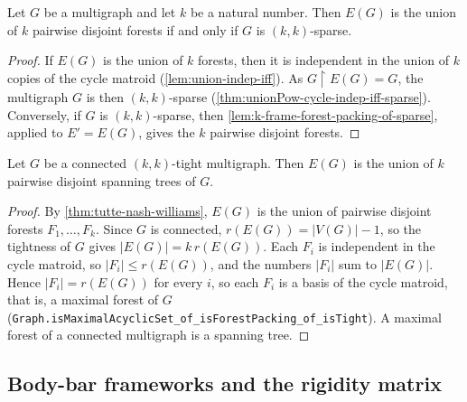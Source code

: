 \begin{theorem}
  \label{thm:tutte-nash-williams}
  \leanok
  Let $G$ be a multigraph and let $k$ be a natural number. Then $E(G)$
  is the union of $k$ pairwise disjoint forests if and only if $G$ is
  $(k, k)$-sparse.
\end{theorem}
\begin{proof}
  \leanok
  If $E(G)$ is the union of $k$ forests, then it is independent in the
  union of $k$ copies of the cycle matroid (\cref{lem:union-indep-iff}).
  As $G \restriction E(G) = G$, the multigraph $G$ is then
  $(k, k)$-sparse (\cref{thm:unionPow-cycle-indep-iff-sparse}).
  Conversely, if $G$ is $(k, k)$-sparse, then
  \cref{lem:k-frame-forest-packing-of-sparse}, applied to $E' = E(G)$,
  gives the $k$ pairwise disjoint forests.
\end{proof}

\begin{corollary}
  \label{cor:k-spanning-trees}
  \leanok
  Let $G$ be a connected $(k, k)$-tight multigraph. Then $E(G)$ is the
  union of $k$ pairwise disjoint spanning trees of $G$.
\end{corollary}
\begin{proof}
  \leanok
  By \cref{thm:tutte-nash-williams}, $E(G)$ is the union of pairwise
  disjoint forests $F_1, \dots, F_k$. Since $G$ is connected,
  $r(E(G)) = |V(G)| - 1$, so the tightness of $G$ gives
  $|E(G)| = k\, r(E(G))$. Each $F_i$ is independent in the cycle
  matroid, so $|F_i| \le r(E(G))$, and the numbers $|F_i|$ sum to
  $|E(G)|$. Hence $|F_i| = r(E(G))$ for every $i$, so each $F_i$ is a
  basis of the cycle matroid, that is, a maximal forest of $G$
  (\texttt{Graph.\allowbreak{}isMaximalAcyclicSet\_\allowbreak{}of\_\allowbreak{}isForestPacking\_\allowbreak{}of\_\allowbreak{}isTight}).
  A maximal forest of a connected multigraph is a spanning tree.
\end{proof}

\subsection{Body-bar frameworks and the rigidity matrix}
\label{sec:body-bar-framework}

